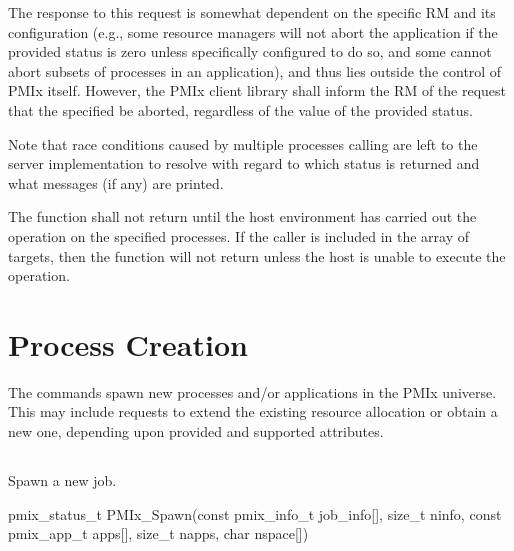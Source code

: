 \adviceuserstart
The response to this request is somewhat dependent on the specific \acl{RM} and its configuration (e.g., some resource managers will not abort the application if the provided status is zero unless specifically configured to do so, and some cannot abort subsets of processes in an application), and thus lies outside the control of PMIx itself.
However, the PMIx client library shall inform the \ac{RM} of the request that the specified  be aborted, regardless of the value of the provided status.

Note that race conditions caused by multiple processes calling  are left to the server implementation to resolve with regard to which status is returned and what messages (if any) are printed.
\adviceuserend

The function shall not return until the host environment has carried out the operation on the specified processes. If the caller is included in the array of targets, then the function will not return unless the host is unable to execute the operation.


\section{Process Creation}
\label{chap:api_proc_mgmt:spawn}

The  commands spawn new processes and/or applications in the \ac{PMIx} universe. This may include requests to extend the existing resource allocation or obtain a new one, depending upon provided and supported attributes.

\subsection{}

\summary

Spawn a new job.

\format

\cspecificstart
\begin{codepar}
pmix_status_t
PMIx_Spawn(const pmix_info_t job_info[], size_t ninfo,
           const pmix_app_t apps[], size_t napps,
           char nspace[])
\end{codepar}
\cspecificend

\begin{arglist}
\end{arglist}

